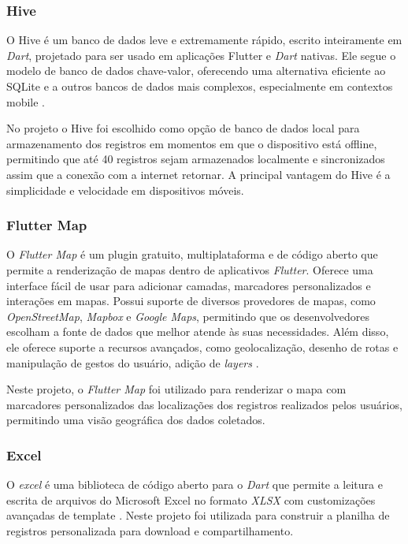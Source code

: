 \subsubsection{Hive}

O Hive é um banco de dados leve e extremamente rápido, escrito inteiramente 
em \textit{Dart}, projetado para ser usado em aplicações Flutter e 
\textit{Dart} nativas. Ele segue o modelo de banco de dados chave-valor, 
oferecendo uma alternativa eficiente ao SQLite e a outros bancos de dados 
mais complexos, especialmente em contextos mobile \cite{hive2025}.

No projeto o Hive foi escolhido como opção de banco de dados local para armazenamento dos registros em momentos em que o dispositivo está offline, 
permitindo que até 40 registros sejam armazenados localmente e sincronizados assim que a conexão com a internet retornar.
A principal vantagem do Hive é a simplicidade e velocidade em dispositivos móveis.

\subsubsection{Flutter Map}
O \textit{Flutter Map} é um plugin gratuito, multiplataforma e de código aberto
que permite a renderização de mapas 
dentro de aplicativos \textit{Flutter}. Oferece uma interface fácil de usar 
para adicionar camadas, marcadores personalizados e interações em mapas.
Possui suporte de diversos provedores de mapas, como
\textit{OpenStreetMap}, \textit{Mapbox} e \textit{Google Maps}, 
permitindo que os desenvolvedores 
 escolham a fonte de dados que melhor atende às suas necessidades. 
 Além disso, ele oferece suporte a recursos avançados, como 
 geolocalização, desenho de rotas e manipulação de gestos do 
 usuário, adição de \textit{layers} \cite{flutter_map_doc}.
 
 Neste projeto, o \textit{Flutter Map} foi utilizado para renderizar o mapa
 com marcadores personalizados das localizações dos registros realizados 
 pelos usuários, permitindo uma visão geográfica dos dados coletados.

\subsubsection{Excel}

O \textit{excel} é uma biblioteca de código aberto para o
\textit{Dart} que permite a leitura e escrita de arquivos do Microsoft Excel 
no formato \textit{XLSX} com customizações avançadas de template \cite{excel_flutter}.
Neste projeto foi utilizada para construir a planilha de registros personalizada para download e compartilhamento.

